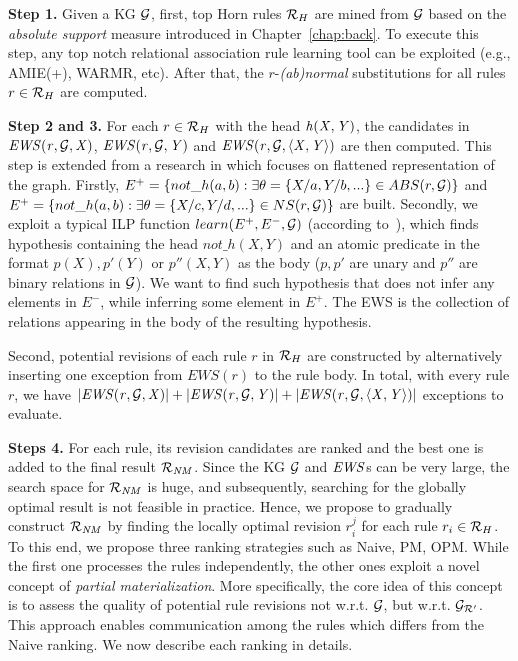 \noindent \textbf{Step 1.} Given a KG $\mathcal{G}$, first, top Horn rules $\mathcal{R}_H$ are mined from $\mathcal{G}$ based on the \textit{absolute support} measure introduced in Chapter~\ref{chap:back}. To execute this step, any top notch relational association rule learning tool can be exploited (e.g., AMIE(+), WARMR, etc). After that, the $r$-\emph{(ab)normal} substitutions for all rules $r\in \mathcal{R}_H$ are computed.
\smallskip


\noindent \textbf{Step 2 and 3.} For each $r \in \mathcal{R}_H$ with the head $\mathit{h(X,Y)}$, the candidates in $\mathit{EWS(r,\mathcal{G},X)}$, $\mathit{EWS(r,\mathcal{G},Y)}$ and $\mathit{EWS(r,\mathcal{G},\langle X,Y\rangle)}$ are then computed. This step is extended from a research in \cite{ref12} which focuses on flattened representation of the graph. Firstly, $E^+ = \{not\_h(a, b): \exists \theta = \{X/a, Y/b, ... \} \in ABS(r, \mathcal{G})\}$ and $E^+ = \{not\_h(a, b): \exists \theta = \{X/c, Y/d, ... \} \in NS(r, \mathcal{G})\}$ are built. Secondly, we exploit a typical ILP function $learn(E^+, E^-, \mathcal{G})$ (according to~\cite{ref55}), which finds hypothesis containing the head $not\_h(X, Y)$ and an atomic predicate in the format $p(X), p'(Y)$ or $p''(X, Y)$ as the body ($p, p'$ are unary and $p''$ are binary relations in $\mathcal{G}$). We want to find such hypothesis that does not infer any elements in $E^-$, while inferring some element in $E^+$. The EWS is the collection of relations appearing in the body of the resulting hypothesis.

Second, potential revisions of each rule $r$ in $\mathcal{R}_H$ are constructed by alternatively inserting one exception from $EWS(r)$ to the rule body. In total, with every rule $r$, we have $|\mathit{EWS(r,\mathcal{G},X)}|+|\mathit{EWS(r,\mathcal{G},Y)}|+|\mathit{EWS(r,\mathcal{G},\langle X,Y\rangle)}|$ exceptions to evaluate.

\smallskip

\noindent \textbf{Steps 4.} For each rule, its revision candidates are ranked and the best one is added to the final result $\mathcal{R}_{\mathit{NM}}$. Since the KG $\mathcal{G}$ and $\mathit{EWS}$s can be very large, the search space for $\mathcal{R}_{\mathit{NM}}$ is huge, and subsequently, searching for the globally optimal result is not feasible in practice. Hence, we propose to gradually construct $\mathcal{R}_{\mathit{NM}}$ by finding the locally optimal revision $r_i^{j}$ for each rule $r_i \in \mathcal{R}_{H}$. To this end, we propose three ranking strategies such as Naive, PM, OPM. While the first one processes the rules independently, the other ones exploit a novel concept of \emph{partial materialization}. More specifically, the core idea of this concept is to assess the quality of potential rule revisions not w.r.t. $\mathcal{G}$, but w.r.t. $\mathcal{G}_{\mathcal{R}'}$. This approach enables communication among the rules which differs from the Naive ranking. We now describe each ranking in details.

